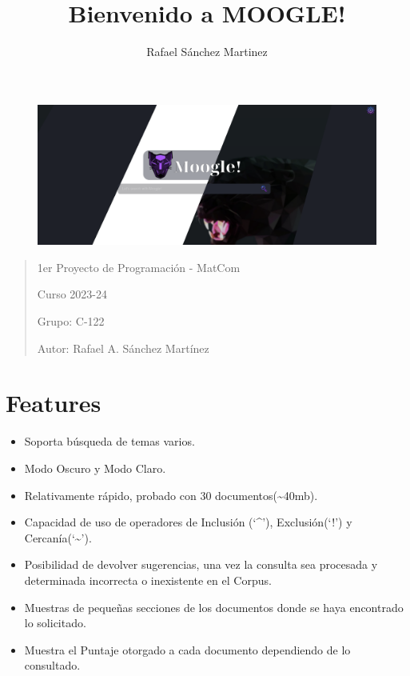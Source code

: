 \documentclass{article}
\begin{document}
\title{Bienvenido a MOOGLE!}
\author{Rafael Sánchez Martinez}
\maketitle

\begin{figure}[h]
    \includegraphics[width=470px]{Assets/moogle.png}
\end{figure}

\begin{quote}
1er Proyecto de Programación - MatCom

Curso 2023-24

Grupo: C-122

Autor: Rafael A. Sánchez Martínez
\end{quote}

\section*{Features}\label{sec:ent}
\begin{itemize}
    \item
  Soporta búsqueda de temas varios.
    \item
  Modo Oscuro y Modo Claro.
    \item
  Relativamente rápido, probado con 30 documentos(\textasciitilde40mb).
    \item
  Capacidad de uso de operadores de Inclusión (`\^{}'), Exclusión(`!') y
  Cercanía(`\textasciitilde{}').
    \item
  Posibilidad de devolver sugerencias, una vez la consulta sea procesada
  y determinada incorrecta o inexistente en el Corpus.
    \item
  Muestras de pequeñas secciones de los documentos donde se haya
  encontrado lo solicitado.
    \item
  Muestra el Puntaje otorgado a cada documento dependiendo de lo
  consultado.
\end{itemize}
\end{document}
